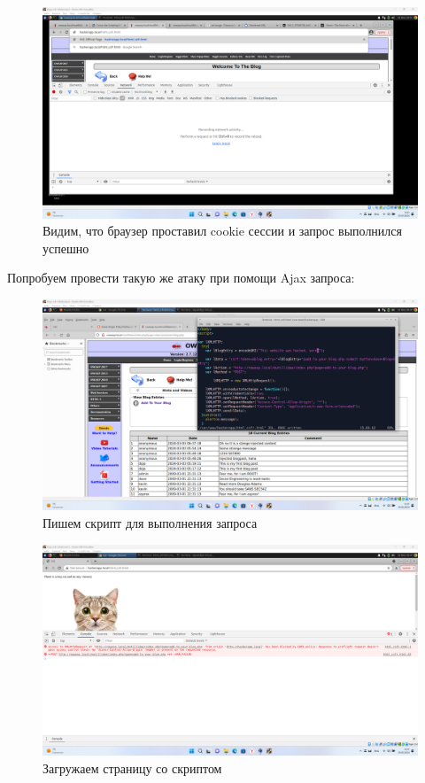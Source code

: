 \documentclass[a4paper]{article}
\begin{document}
  \begin{figure}[H]
    \centering
    \includegraphics[width=\textwidth]{Screenshot_58}
    \caption{Видим, что браузер проставил cookie сессии и запрос выполнился успешно}
  \end{figure}

  Попробуем провести такую же атаку при помощи Ajax запроса:

  \begin{figure}[H]
    \centering
    \includegraphics[width=\textwidth]{Screenshot_72}
    \caption{Пишем скрипт для выполнения запроса}
  \end{figure}

  \begin{figure}[H]
    \centering
    \includegraphics[width=\textwidth]{Screenshot_73}
    \caption{Загружаем страницу со скриптом}
  \end{figure}
\end{document}

